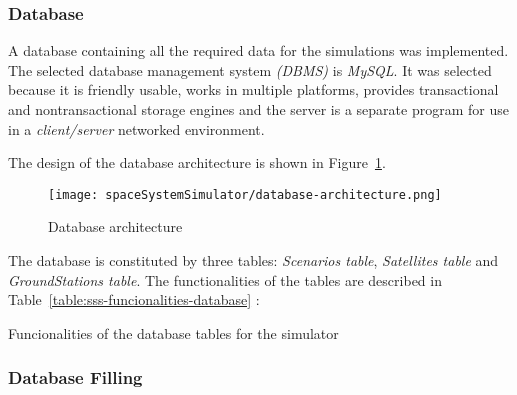 \subsubsection{Database}

A database containing all the required data for the simulations was
implemented. The selected database management system \emph{(DBMS)} is
\emph{MySQL}. It was selected because it is friendly usable, works in multiple
platforms, provides transactional and nontransactional storage engines and the server is a separate program for use in a \emph{client/server} networked environment.

The design of the database architecture is shown in Figure~\ref{fig:sss-database-architecture}.

\begin{figure}[!h]
\begin{center}
\texttt{[image: spaceSystemSimulator/database-architecture.png]}
\caption{Database architecture}
\label{fig:sss-database-architecture}
\end{center}
\end{figure}

The database is constituted by three tables: \emph{Scenarios table},
\emph{Satellites table} and \emph{GroundStations table}. The functionalities of the tables are described in
Table~\ref{table:sss-funcionalities-database} :

\begin{table}[hp]
  \centering
  {\small
  
  }
  \caption{Funcionalities of the database tables for the simulator}
  \label{table:sss-funcionalities-database}
\end{table}


\subsubsection{Database Filling}

